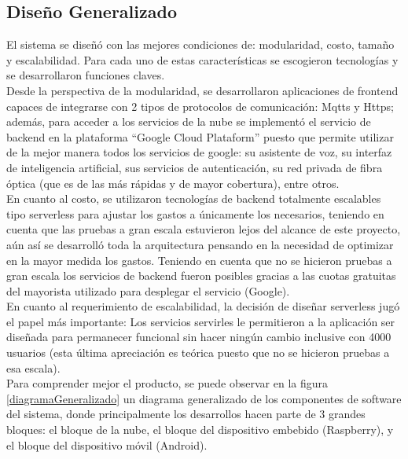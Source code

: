 
%
%
%


\subsection{Diseño Generalizado}

El sistema se diseñó con las mejores condiciones de: modularidad, costo, tamaño y escalabilidad. Para cada uno de estas características se escogieron tecnologías y se desarrollaron funciones claves. 
\vspace{0.5cm}\\
Desde la perspectiva de la modularidad, se desarrollaron aplicaciones de frontend capaces de integrarse con 2 tipos de protocolos de comunicación: Mqtts y Https; además, para acceder a los servicios de la nube se implementó el servicio de backend en la plataforma ``Google Cloud Plataform'' puesto que permite utilizar de la mejor manera todos los servicios de google: su asistente de voz, su interfaz de inteligencia artificial, sus servicios de autenticación, su red privada de fibra óptica (que es de las más rápidas y de mayor cobertura), entre otros.
\vspace{0.5cm}\\
En cuanto al costo, se utilizaron tecnologías de backend totalmente escalables tipo serverless para ajustar los gastos a únicamente los necesarios, teniendo en cuenta que las pruebas a gran escala estuvieron lejos del alcance de este proyecto, aún así se desarrolló toda la arquitectura pensando en la necesidad de optimizar en la mayor medida los gastos. Teniendo en cuenta que no se hicieron pruebas a gran escala los servicios de backend fueron posibles gracias a las cuotas gratuitas del mayorista utilizado para desplegar el servicio (Google).
\vspace{0.5cm}\\
En cuanto al requerimiento de escalabilidad, la decisión de diseñar serverless jugó el papel más importante: Los servicios servirles le permitieron a la aplicación ser diseñada para permanecer funcional sin hacer ningún cambio inclusive con 4000 usuarios (esta última apreciación es teórica puesto que no se hicieron pruebas a esa escala).
\vspace{0.5cm}\\
Para comprender mejor el producto, se puede observar en la figura \ref{diagramaGeneralizado} un diagrama generalizado de los componentes de software del sistema, donde principalmente los desarrollos hacen parte de 3 grandes bloques: el bloque de la nube, el bloque del dispositivo embebido (Raspberry), y el bloque del dispositivo móvil (Android).
